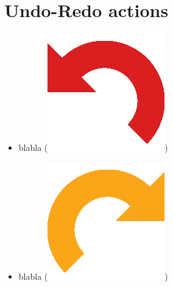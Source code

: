 \section{Undo-Redo actions}

\begin{itemize}
\item blabla (\includegraphics[scale=0.5]{images/03/undo.png})
\item blabla (\includegraphics[scale=0.5]{images/03/redo.png})
\end{itemize}

